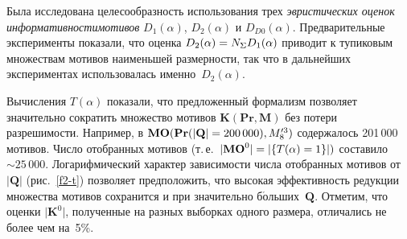 \begin{multicols}{2}
Была исследована целесообразность использования трех
\textit{эвристических оценок ин\-фор\-ма\-тив\-ности}\linebreak \textit{мотивов} $D_1(\alpha)$,
$D_2(\alpha)$ и $D_{D0}(\alpha)$. Предварительные эксперименты показали, что
оценка $D_2(\alpha)\hm=N_\Sigma D_1(\alpha)$ приводит к тупиковым множествам\linebreak
мотивов наименьшей размерности, так что в дальнейших экспериментах
использовалась именно~$D_2(\alpha)$.

Вычисления $T(\alpha)$ показали, что предложенный формализм позволяет
значительно сократить множество мотивов $\mathbf{K}(\mathbf{Pr}, \mathbf{M})$ без потери
раз\-ре\-ши\-мости. Например, в $\mathbf{MO}(\mathbf{Pr}(\vert \mathbf{Q}\vert \hm=200\,000),
M_8^{\prime 3})$ содержалось 201\,000 мотивов. Число отобранных мотивов
(т.\,е.\ $\vert \mathbf{MO}^0\vert \hm =\vert \{T(\alpha)=1\}\vert )$ составило $\sim 25\,000$.
Логарифмический характер зави\-си\-мости числа отобранных мотивов от~$\vert
\mathbf{Q}\vert$ (рис.~\ref{f2-t}) поз\-во\-ля\-ет предположить, что высокая эффективность
редукции множества мотивов сохранится и при значительно
б$\acute{\mbox{о}}$льших~$\mathbf{Q}$. Отметим, что оценки $\vert \mathbf{K}^0\vert$,
полученные на разных выборках одного размера, отличались не более чем
на~5\%.


\end{multicols}

